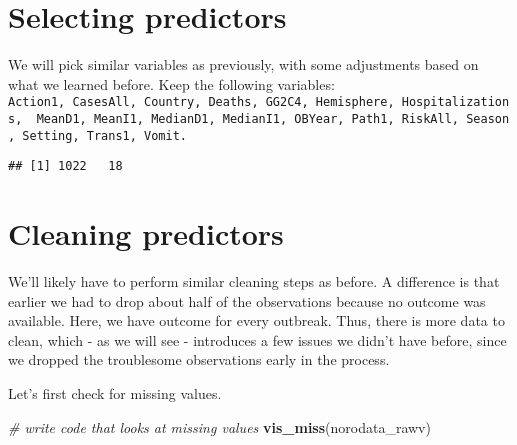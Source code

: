 \documentclass[]{article}
\newenvironment{Shaded}{\begin{snugshade}}{\end{snugshade}}
\newcommand{\CommentTok}[1]{\textcolor[rgb]{0.56,0.35,0.01}{\textit{#1}}}
\newcommand{\DecValTok}[1]{\textcolor[rgb]{0.00,0.00,0.81}{#1}}
\newcommand{\KeywordTok}[1]{\textcolor[rgb]{0.13,0.29,0.53}{\textbf{#1}}}
\newcommand{\NormalTok}[1]{#1}
\newcommand{\OperatorTok}[1]{\textcolor[rgb]{0.81,0.36,0.00}{\textbf{#1}}}
\newcommand{\StringTok}[1]{\textcolor[rgb]{0.31,0.60,0.02}{#1}}
\begin{document}
\hypertarget{selecting-predictors}{%
\section{Selecting predictors}\label{selecting-predictors}}

We will pick similar variables as previously, with some adjustments
based on what we learned before. Keep the following variables:
\texttt{Action1,\ CasesAll,\ Country,\ Deaths,\ GG2C4,\ Hemisphere,\ Hospitalizations,\ \ MeanD1,\ MeanI1,\ MedianD1,\ MedianI1,\ OBYear,\ Path1,\ RiskAll,\ Season,\ Setting,\ Trans1,\ Vomit.}

\begin{Shaded}
\end{Shaded}

\begin{verbatim}
## [1] 1022   18
\end{verbatim}

\hypertarget{cleaning-predictors}{%
\section{Cleaning predictors}\label{cleaning-predictors}}

We'll likely have to perform similar cleaning steps as before. A
difference is that earlier we had to drop about half of the observations
because no outcome was available. Here, we have outcome for every
outbreak. Thus, there is more data to clean, which - as we will see -
introduces a few issues we didn't have before, since we dropped the
troublesome observations early in the process.

Let's first check for missing values.

\begin{Shaded}
\begin{Highlighting}[]
\CommentTok{# write code that looks at missing values}
\KeywordTok{vis_miss}\NormalTok{(norodata_rawv)}
\end{Highlighting}
\end{Shaded}
\end{document}
